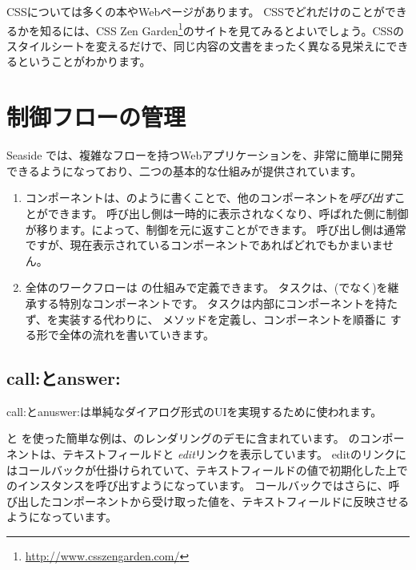 \documentclass[a4paper,10pt,twoside]{book}
\begin{document}
CSSについては多くの本やWebページがあります。
CSSでどれだけのことができるかを知るには、CSS Zen Garden\footnote{\url{http://www.csszengarden.com/}}のサイトを見てみるとよいでしょう。CSSのスタイルシートを変えるだけで、同じ内容の文書をまったく異なる見栄えにできるということがわかります。

\section{制御フローの管理}

Seaside では、複雑なフローを持つWebアプリケーションを、非常に簡単に開発できるようになっており、二つの基本的な仕組みが提供されています。

\begin{enumerate}
  \item コンポーネントは、のように書くことで、他のコンポーネントを\emph{呼び出す}ことができます。
    呼び出し側は一時的に表示されなくなり、呼ばれた側に制御が移ります。によって、制御を元に返すことができます。
    呼び出し側は通常 ですが、現在表示されているコンポーネントであればどれでもかまいません。

  \item 全体のワークフローは の仕組みで定義できます。
    タスクは、(でなく)を継承する特別なコンポーネントです。
    タスクは内部にコンポーネントを持たず、を実装する代わりに、 メソッドを定義し、コンポーネントを順番に する形で全体の流れを書いていきます。
\end{enumerate}

\subsection{call:とanswer:}

call:とanuswer:は単純なダイアログ形式のUIを実現するために使われます。

 と  を使った簡単な例は、のレンダリングのデモに含まれています。
 のコンポーネントは、テキストフィールドと \emph{edit}リンクを表示しています。
editのリンクにはコールバックが仕掛けられていて、テキストフィールドの値で初期化した上でのインスタンスを呼び出すようになっています。
コールバックではさらに、呼び出したコンポーネントから受け取った値を、テキストフィールドに反映させるようになっています。
 
\end{document}
